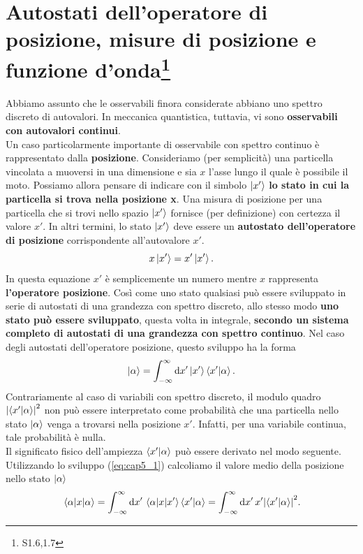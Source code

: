 \chapter[Autostati dell'operatore di posizione]{Autostati dell'operatore di posizione, misure di posizione e funzione d'onda\footnote{S1.6,1.7}}
Abbiamo assunto che le osservabili finora considerate abbiano uno spettro discreto di autovalori. In meccanica quantistica, tuttavia, vi sono \textbf{osservabili con autovalori continui}.\\
Un caso particolarmente importante di osservabile con spettro continuo è rappresentato dalla \textbf{posizione}.
Consideriamo (per semplicità) una particella vincolata a muoversi in una dimensione e sia $x$ l'asse lungo il quale è possibile il moto. Possiamo allora pensare di indicare con il simbolo $\ket{x'}$ \textbf{lo stato in cui la particella si trova nella posizione x}.
Una misura di posizione per una particella che si trovi nello spazio $\ket{x'}$ fornisce (per definizione) con certezza il valore $x'$. In altri termini, lo stato $\ket{x'}$ deve essere un \textbf{autostato dell'operatore di posizione} corrispondente all'autovalore $x'$.
\begin{equation}
  x\ket{x'} = x'\ket{x'} .
\end{equation}
In questa equazione $x'$ è semplicemente un numero mentre $x$ rappresenta \textbf{l'operatore posizione}.
Così come uno stato qualsiasi può essere sviluppato in serie di autostati di una grandezza con spettro discreto, allo stesso modo \textbf{uno stato può essere sviluppato}, questa volta in integrale, \textbf{secondo un sistema completo di autostati di una grandezza con spettro continuo}. Nel caso degli autostati dell'operatore posizione, questo sviluppo ha la forma
\begin{equation}
  \label{eq:cap5_1}
  \ket{\alpha} = \int_{-\infty}^{\infty}\dd{x'}\ket{x'}\braket{x'}{\alpha} .
\end{equation}
Contrariamente al caso di variabili con spettro discreto, il modulo quadro $\abs{\braket{x'}{\alpha}}^2$ non può essere interpretato come probabilità che una particella nello stato $\ket{\alpha}$ venga a trovarsi nella posizione $x'$. Infatti, per una variabile continua, tale probabilità è nulla.\\
Il significato fisico dell'ampiezza $\braket{x'}{\alpha}$ può essere derivato nel modo seguente.
Utilizzando lo sviluppo (\ref{eq:cap5_1}) calcoliamo il valore medio della posizione nello stato $\ket{\alpha}$
\begin{align}
  \ev{x}{\alpha} = \int_{-\infty}^{\infty}\dd{x'}\mel{\alpha}{x}{x'}\braket{x'}{\alpha}=\int_{-\infty}^{\infty}\dd{x'}x'\abs{\braket{x'}{\alpha}}^2 .
\end{align}
